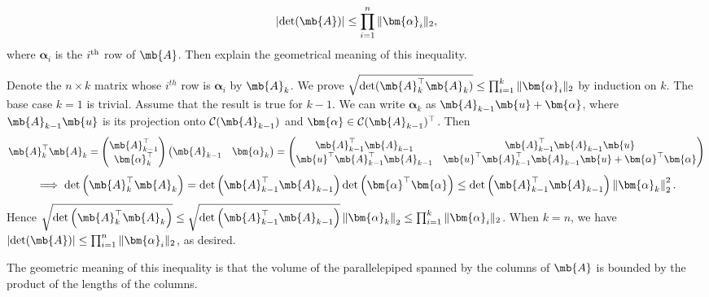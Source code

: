 \begin{exercise}
\begin{enumerate}
            \begin{align*}
                \left|\det(\mb{A})\right|\le \prod_{i=1}^n\|\bm{\alpha}_i\|_2,
            \end{align*}
            where $\bm{\alpha}_i$ is the $i^{\rm th}$ row of $\mb{A}$. Then explain the geometrical meaning of this inequality.
            \begin{solution}
                Denote the $n\times k$ matrix whose $i^{th}$ row is $\bm{\alpha}_i$ by $\mb{A}_k$. We prove $\sqrt{\det(\mb{A}_k^\top\mb{A}_k)}\le \prod_{i=1}^k\|\bm{\alpha}_i\|_2$ by induction on $k$. The base case $k=1$ is trivial. Assume that the result is true for $k-1$. We can write $\bm{\alpha}_k$ as $\mb{A}_{k-1}\mb{u} + \bm{\alpha}$, where $\mb{A}_{k-1}\mb{u}$ is its projection onto $\mathcal{C}(\mb{A}_{k-1})$ and $\bm{\alpha}\in\mathcal{C}(\mb{A}_{k-1})^\top$. Then
                $$\mb{A}_k^\top\mb{A}_k=\begin{pmatrix}
                    \mb{A}_{k-1}^\top \\ \bm{\alpha}_k^\top
                \end{pmatrix}\begin{pmatrix}
                    \mb{A}_{k-1} & \bm{\alpha}_k
                \end{pmatrix} = \begin{pmatrix}
                    \mb{A}_{k-1}^\top\mb{A}_{k-1} & \mb{A}_{k-1}^\top\mb{A}_{k-1}\mb{u} \\
                    \mb{u}^\top\mb{A}_{k-1}^\top\mb{A}_{k-1} & \mb{u}^\top\mb{A}_{k-1}^\top\mb{A}_{k-1}\mb{u} + \bm{\alpha}^\top\bm{\alpha}
                \end{pmatrix}$$
                $$\implies\det\left(\mb{A}_k^\top\mb{A}_k\right)=\det\left(\mb{A}_{k-1}^\top\mb{A}_{k-1}\right)\det\left(\bm{\alpha}^\top\bm{\alpha}\right)\le \det\left(\mb{A}_{k-1}^\top\mb{A}_{k-1}\right)\left\|\bm{\alpha}_k\right\|^2_2.$$
                Hence $\sqrt{\det\left(\mb{A}_k^\top\mb{A}_k\right)}\le \sqrt{\det\left(\mb{A}_{k-1}^\top\mb{A}_{k-1}\right)}\left\|\bm{\alpha}_k\right\|_2\le\prod_{i=1}^k\|\bm{\alpha}_i\|_2$. When $k=n$, we have $\left|\det(\mb{A})\right|\le \prod_{i=1}^n\|\bm{\alpha}_i\|_2$, as desired. 
                
                The geometric meaning of this inequality is that the volume of the parallelepiped spanned by the columns of $\mb{A}$ is bounded by the product of the lengths of the columns.
                \qedhere
            \end{solution}
    \end{enumerate}
\end{exercise}
\newpage




